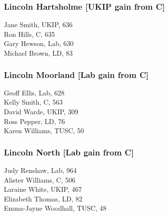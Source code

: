 \documentclass[a4paper,openany,10pt]{book}
\begin{document}
\subsubsection*{Lincoln Hartsholme \hspace*{\fill}\nolinebreak[1]%
\enspace\hspace*{\fill}
[UKIP gain from C]}



Jane Smith, UKIP, 636\\
Ron Hills, C, 635\\
Gary Hewson, Lab, 630\\
Michael Brown, LD, 83\\


\subsubsection*{Lincoln Moorland \hspace*{\fill}\nolinebreak[1]%
\enspace\hspace*{\fill}
[Lab gain from C]}



Geoff Ellis, Lab, 628\\
Kelly Smith, C, 563\\
David Warde, UKIP, 309\\
Ross Pepper, LD, 76\\
Karen Williams, TUSC, 50\\


\subsubsection*{Lincoln North \hspace*{\fill}\nolinebreak[1]%
\enspace\hspace*{\fill}
[Lab gain from C]}



Judy Renshaw, Lab, 964\\
Alister Williams, C, 506\\
Laraine White, UKIP, 467\\
Elizabeth Thomas, LD, 82\\
Emma-Jayne Woodhall, TUSC, 48\\
\end{document}
